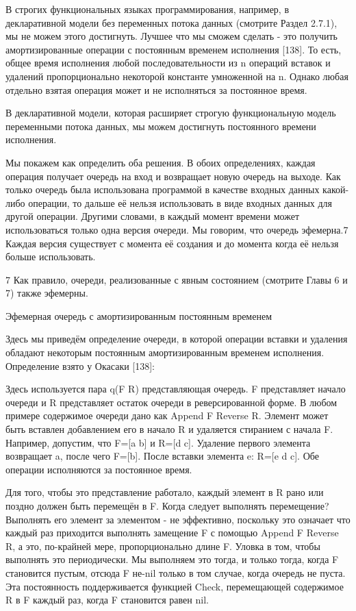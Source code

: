 В строгих функциональных языках программирования, например, в декларативной модели без переменных потока данных (смотрите Раздел 2.7.1), мы не можем этого достигнуть. Лучшее что мы сможем сделать - это получить амортизированные операции с постоянным временем исполнения [138]. То есть, общее время исполнения любой последовательности из n операций вставок и удалений пропорционально некоторой константе умноженной на n. Однако любая отдельно взятая операция может и не исполняться за постоянное время.

В декларативной модели, которая расширяет строгую функциональную модель переменными потока данных, мы можем достигнуть постоянного времени исполнения.

Мы покажем как определить оба решения. В обоих определениях, каждая операция получает очередь на вход и возвращает новую очередь на выходе. Как только очередь была использована программой в качестве входных данных какой-либо операции, то дальше её нельзя использовать в виде входных данных для другой операции. Другими словами, в каждый момент времени может использоваться только одна версия очереди. Мы говорим, что очередь эфемерна.7 Каждая версия существует с момента её создания и до момента когда её нельзя больше использовать.

7 Как правило, очереди, реализованные с явным состоянием (смотрите Главы 6 и 7) также эфемерны.

Эфемерная очередь с амортизированным постоянным временем

Здесь мы приведём определение очереди, в которой операции вставки и удаления обладают некоторым постоянным амортизированным временем исполнения. Определение взято у Окасаки [138]:

Здесь используется пара q(F R) представляющая очередь. F представляет начало очереди и R представляет остаток очереди в реверсированной форме. В любом примере содержимое очереди дано как {Append F {Reverse R}}. Элемент может быть вставлен добавлением его в начало R и удаляется стиранием с начала F. Например, допустим, что F=[a b] и R=[d c]. Удаление первого элемента возвращает a, после чего F=[b]. После вставки элемента e: R=[e d c]. Обе операции исполняются за постоянное время.

Для того, чтобы это представление работало, каждый элемент в R рано или поздно должен быть перемещён в F. Когда следует выполнять перемещение? Выполнять его элемент за элементом - не эффективно, поскольку это означает что каждый раз приходится выполнять замещение F с помощью {Append F {Reverse R}}, а это, по-крайней мере, пропорционально длине F. Уловка в том, чтобы выполнять это периодически. Мы выполняем это тогда, и только тогда, когда F становится пустым, отсюда F не-nil только в том случае, когда очередь не пуста. Эта постоянность поддерживается функцией Check, перемещающей содержимое R в F каждый раз, когда F становится равен nil.

